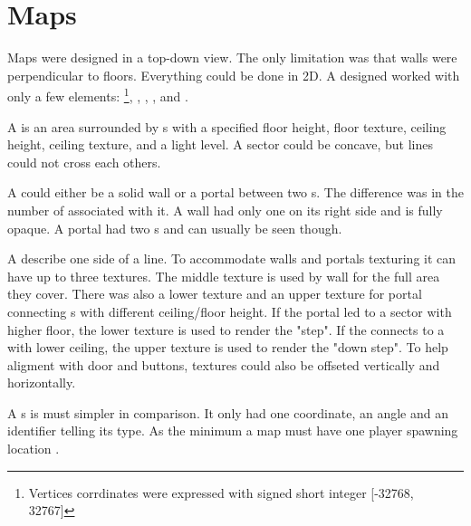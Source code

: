 

\section{Maps}
Maps were designed in a top-down view. The only limitation was that walls were perpendicular to floors. Everything could be done in 2D. A designed worked with only a few elements: \footnote{Vertices corrdinates were expressed with signed short integer [-32768, 32767]}, , , , and .\\
\par
{}

\par
A  is an area surrounded by s with a specified floor height, floor texture, ceiling height, ceiling texture, and a light level. A sector could be concave, but lines could not cross each others.\\
\par
A  could either be a solid wall or a portal between two s. The difference was in the number of  associated with it. A wall had only one  on its right side and is fully opaque. A portal had two s and can usually be seen though.\\
\par
A  describe one side of a line. To accommodate walls and portals texturing it can have up to three textures. The middle texture is used by wall for the full area they cover. There was also a lower texture and an upper texture for portal connecting s with different ceiling/floor height. If the portal led to a sector with higher floor, the lower texture is used to render the "step". If the  connects to a  with lower ceiling, the upper texture is used to render the "down step". To help aligment with door and buttons,  textures could also be offseted vertically and horizontally. \\
\par
A s is must simpler in comparison. It only had one  coordinate, an angle and an identifier telling its type. As the minimum a map must have one player spawning location .\\

